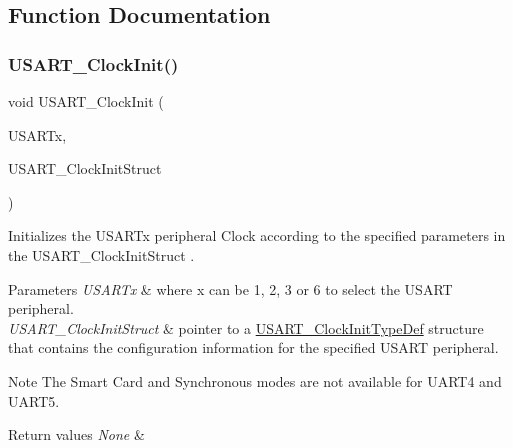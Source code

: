 \subsection{Function Documentation}
\mbox{\label{group___u_s_a_r_t___group1_gadb50c7a2175c91acd3728f8eefd0c63d}} 
\subsubsection{\texorpdfstring{U\+S\+A\+R\+T\+\_\+\+Clock\+Init()}{USART\_ClockInit()}}
{\footnotesize\ttfamily void U\+S\+A\+R\+T\+\_\+\+Clock\+Init (\begin{DoxyParamCaption}\item[{\hyperlink{struct_u_s_a_r_t___type_def}{U\+S\+A\+R\+T\+\_\+\+Type\+Def} $\ast$}]{U\+S\+A\+R\+Tx,  }\item[{\hyperlink{struct_u_s_a_r_t___clock_init_type_def}{U\+S\+A\+R\+T\+\_\+\+Clock\+Init\+Type\+Def} $\ast$}]{U\+S\+A\+R\+T\+\_\+\+Clock\+Init\+Struct }\end{DoxyParamCaption})}



Initializes the U\+S\+A\+R\+Tx peripheral Clock according to the specified parameters in the U\+S\+A\+R\+T\+\_\+\+Clock\+Init\+Struct . 


\begin{DoxyParams}{Parameters}
{\em U\+S\+A\+R\+Tx} & where x can be 1, 2, 3 or 6 to select the U\+S\+A\+RT peripheral. \\
\hline
{\em U\+S\+A\+R\+T\+\_\+\+Clock\+Init\+Struct} & pointer to a \hyperlink{struct_u_s_a_r_t___clock_init_type_def}{U\+S\+A\+R\+T\+\_\+\+Clock\+Init\+Type\+Def} structure that contains the configuration information for the specified U\+S\+A\+RT peripheral. \\
\hline
\end{DoxyParams}
\begin{DoxyNote}{Note}
The Smart Card and Synchronous modes are not available for U\+A\+R\+T4 and U\+A\+R\+T5. 
\end{DoxyNote}

\begin{DoxyRetVals}{Return values}
{\em None} & \\
\hline
\end{DoxyRetVals}


